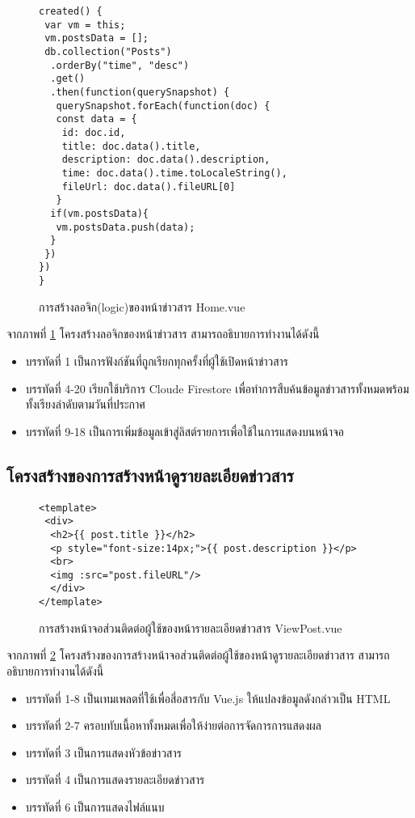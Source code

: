 		\begin{figure}[H]
			{\begin{lstlisting}
created() {
 var vm = this;
 vm.postsData = [];
 db.collection("Posts")
  .orderBy("time", "desc")
  .get()
  .then(function(querySnapshot) {
   querySnapshot.forEach(function(doc) {
   const data = {
    id: doc.id,
    title: doc.data().title,
    description: doc.data().description,
    time: doc.data().time.toLocaleString(),
    fileUrl: doc.data().fileURL[0]
   }
  if(vm.postsData){
   vm.postsData.push(data);
  }
 })
})
}
				\end{lstlisting}}
			\caption{การสร้างลอจิก(logic)ของหน้าข่าวสาร Home.vue}
			\label{Fig:HomeJs}
		\end{figure}
		จากภาพที่ \ref{Fig:HomeJs} โครงสร้างลอจิกของหน้าข่าวสาร สามารถอธิบายการทำงานได้ดังนี้
		\begin{itemize}[label={--}]
			\item บรรทัดที่ 1  เป็นการฟังก์ชันที่ถูกเรียกทุกครั้งที่ผู้ใช้เปิดหน้าข่าวสาร
			\item บรรทัดที่ 4-20 เรียกใช้บริการ Cloude Firestore เพื่อทำการสืบค้นข้อมูลข่าวสารทั้งหมดพร้อมทั้งเรียงลำดับตามวันที่ประกาศ
			\item บรรทัดที่ 9-18 เป็นการเพิ่มข้อมูลเข้าสู่ลิสต์รายการเพื่อใช้ในการแสดงบนหน้าจอ
		\end{itemize}
		
	\subsection{โครงสร้างของการสร้างหน้าดูรายละเอียดข่าวสาร}
	\begin{figure}[H]
		{\begin{lstlisting}
<template>
 <div>
  <h2>{{ post.title }}</h2>
  <p style="font-size:14px;">{{ post.description }}</p>
  <br>
  <img :src="post.fileURL"/>
  </div>
</template>
				\end{lstlisting}}
			\caption{การสร้างหน้าจอส่วนติดต่อผู้ใช้ของหน้ารายละเอียดข่าวสาร ViewPost.vue}
			\label{Fig:ViewPost}
		\end{figure}
			จากภาพที่ \ref{Fig:ViewPost} โครงสร้างของการสร้างหน้าจอส่วนติดต่อผู้ใช้ของหน้าดูรายละเอียดข่าวสาร  สามารถอธิบายการทำงานได้ดังนี้
			\begin{itemize}[label={--}]
				\item บรรทัดที่ 1-8  เป็นเทมเพลตที่ใช้เพื่อสี่อสารกับ Vue.js ให้แปลงข้อมูลดังกล่าวเป็น HTML
				\item บรรทัดที่ 2-7	 ครอบทับเนื้อหาทั้งหมดเพื่อให้ง่ายต่อการจัดการการแสดงผล
				\item บรรทัดที่ 3 เป็นการแสดงหัวข้อข่าวสาร
				\item บรรทัดที่ 4 เป็นการแสดงรายละเอียดข่าวสาร
				\item บรรทัดที่ 6 เป็นการแสดงไฟล์แนบ
			\end{itemize}
			
